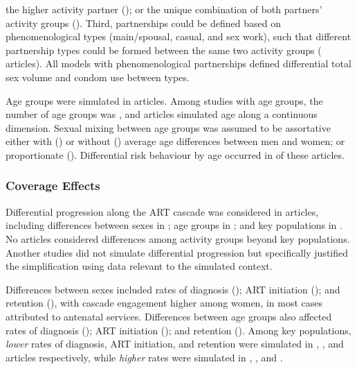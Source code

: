 the higher activity partner (); or
the unique combination of both partners' activity groups ().
Third, partnerships could be defined based on phenomenological types 
(main/spousal, casual, and sex work), such that
different partnership types could be formed between the same two activity groups ( articles).
All models with phenomenological partnerships defined differential total sex volume and condom use between types.  %
\par
Age groups were simulated in  articles.
Among studies with age groups, the number of age groups was ,
and  articles simulated age along a continuous dimension.
Sexual mixing between age groups was assumed to be assortative
either with () or without ()
average age differences between men and women;
or proportionate ().
Differential risk behaviour by age occurred in  of these  articles.
\subsubsection{Coverage Effects}
\label{sss:res:cov}
Differential progression along the ART cascade was considered in  %
 articles, including differences between
sexes in ;
age groups in ; and
key populations in .
No articles considered differences among activity groups beyond key populations. %
Another  studies did not simulate differential progression  %
but specifically justified the simplification using data relevant to the simulated context.
\par
Differences between sexes included
rates of diagnosis ();
ART initiation (); and
retention (),
with cascade engagement higher among women,
in most cases attributed to antenatal services.
Differences between age groups also affected
rates of diagnosis ();
ART initiation (); and
retention ().
Among key populations, \emph{lower} rates of
diagnosis, ART initiation, and retention were simulated in
, , and 
articles respectively, while \emph{higher} rates were simulated in
, , and .

